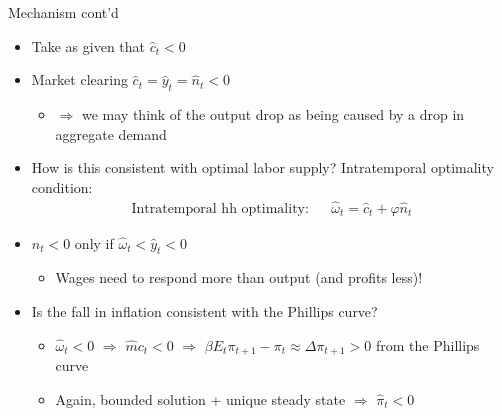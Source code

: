\documentclass[9pt,xcolor={dvipsnames}]{beamer}
\newcommand{\bit}{\begin{itemize}}
\newcommand{\eit}{\end{itemize}}
\newcommand{\bc}{\color{blue}}
\begin{document}
\begin{frame}{Mechanism cont'd}

\bit
\setlength\itemsep{1em}
\item Take as given that $\hat c_t<0$

\item Market clearing $\hat c_t = \hat y_t = \hat n_t < 0$
\bit
\item $\Rightarrow$ we may think of the output drop as being caused by a drop in {\bc aggregate demand}
\eit

\item How is this consistent with optimal labor supply? Intratemporal optimality condition:
\begin{eqnarray}
\text{Intratemporal hh optimality:} && \hat \omega_t = \hat c_t + \varphi \hat n_t  \nonumber
\end{eqnarray}

\item $\hat n_t<0$ only if $\hat \omega_t < \hat y_t < 0$
\bit
\setlength\itemsep{0.5em}
\item Wages need to respond more than output (and profits less)!
\eit

\item Is the fall in inflation consistent with the Phillips curve?
\bit
\setlength\itemsep{0.5em}
\item $\hat \omega_t <0$ $\Rightarrow$ $\hat mc_t<0$ $\Rightarrow$ $\beta E_t \pi_{t+1}-\pi_t \approx \Delta \pi_{t+1} >0$ from the Phillips curve

\item Again, bounded solution + unique steady state $\Rightarrow$ $\hat \pi_t<0$
\eit

\eit


\end{frame}
\end{document}
